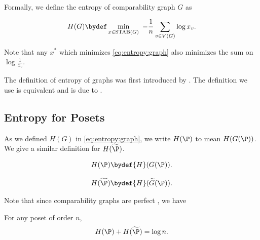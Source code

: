 Formally, we define the entropy of comparability graph $G$ as
\begin{definition}
\begin{equation}
{H}(G) \bydef \min_{x \in \operatorname{STAB}(G)}~ -\frac{1}{n} \sum_{v \in
V(G)} \log x_v.
\label{eq:entropy:graph}
\end{equation}
\end{definition}

Note that any $x^*$ which minimizes \ref{eq:entropy:graph} also minimizes the
sum on $\log \frac{1}{x_v}$.

The definition of entropy of graphs was first introduced by
\citet*{korner1973coding}. The definition we use is equivalent and is due to
\citet*{csiszar:1990}.


\subsection{Entropy for Posets}

As we defined $H(G)$ in \ref{eq:entropy:graph}, we write $H(\P)$ to mean
$H(G(\P))$. We give a similar definition for \(H(\widetilde{\P})\).
\begin{definition}
\begin{displaymath}
{H}(\P) \bydef {H}({G}(\P)).
\end{displaymath}
\end{definition}
\begin{definition}
\begin{displaymath}
{H}(\widetilde{\P}) \bydef {H}(\widetilde{G}(\P)).
\end{displaymath}
\end{definition}

Note that since comparability graphs are perfect \cite{berge:1984}, we have
\begin{theorem}
For any poset of order \(n\),
\begin{displaymath}
H(\P) + H(\widetilde{\P}) = \log n.
\end{displaymath}
\end{theorem}
